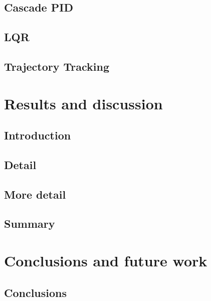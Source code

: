             \subsection{Cascade PID}
            \subsection{LQR}
            \subsection{Trajectory Tracking}

  \section{Results and discussion} %
    \subsection{Introduction}
      \subsection{Detail}
      \subsection{More detail}
      \subsection{Summary}
  \section{Conclusions and future work} %
    \subsection{Conclusions}

